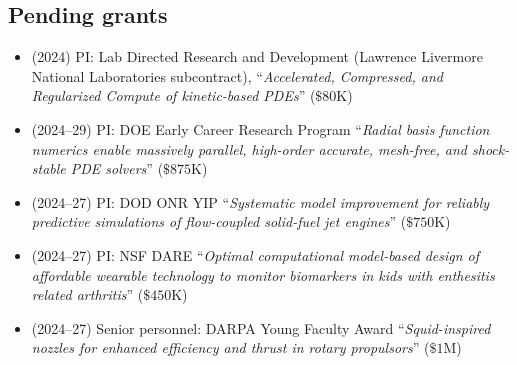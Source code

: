 \subsection{Pending grants}

\begin{itemize}
    \item (2024) PI: Lab Directed Research and Development (Lawrence Livermore National Laboratories subcontract), ``\textit{Accelerated, Compressed, and Regularized Compute of kinetic-based PDEs}'' ($\$80$K)
    \item (2024--29) PI: DOE Early Career Research Program ``\textit{Radial basis function numerics enable massively parallel, high-order accurate, mesh-free, and shock-stable PDE solvers}'' ($\$875$K)
    \item (2024--27) PI: DOD ONR YIP ``\textit{Systematic model improvement for reliably predictive simulations of flow-coupled solid-fuel jet engines}'' ($\$750$K)
    \item (2024--27) PI: NSF DARE ``\textit{Optimal computational model-based design of affordable wearable technology to monitor biomarkers in kids with enthesitis related arthritis}'' ($\$450$K)
    \item (2024--27) Senior personnel: DARPA Young Faculty Award ``\textit{Squid-inspired nozzles for enhanced  efficiency and thrust in rotary propulsors}'' ($\$1$M)
\end{itemize}
